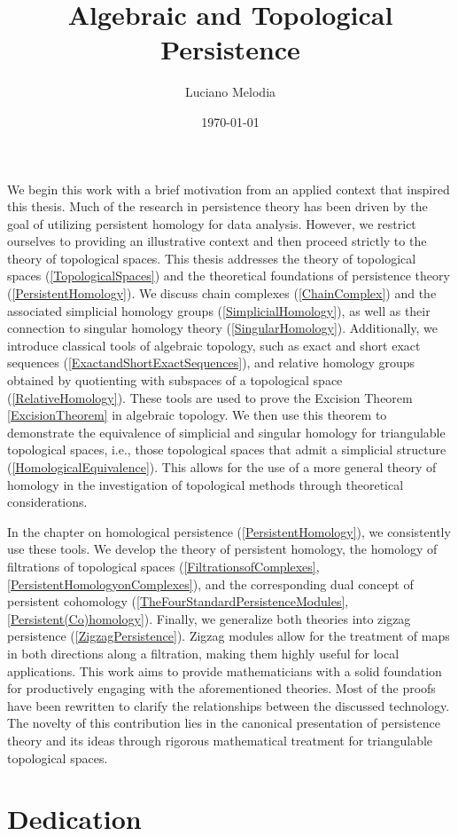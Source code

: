 \documentclass[b5paper, 12pt, twoside]{report}
\title{Algebraic and Topological Persistence}
\author{Luciano Melodia}
\date{\today}
\begin{document}
	
	
	We begin this work with a brief motivation from an applied context that inspired
	this thesis. Much of the research in persistence theory has been driven by the
	goal of utilizing persistent homology for data analysis. However, we restrict
	ourselves to providing an illustrative context and then proceed strictly to
	the theory of topological spaces. This thesis addresses the theory of topological
	spaces (\ref{TopologicalSpaces}) and the theoretical foundations of persistence
	theory (\ref{PersistentHomology}). We discuss chain complexes (\ref{ChainComplex})
	and the associated simplicial homology groups (\ref{SimplicialHomology}), as well
	as their connection to singular homology theory (\ref{SingularHomology}).
	Additionally, we introduce classical tools of algebraic topology, such as
	exact and short exact sequences (\ref{ExactandShortExactSequences}), and relative
	homology groups obtained by quotienting with subspaces of a topological space (\ref{RelativeHomology}).
	These tools are used to prove the Excision Theorem \ref{ExcisionTheorem} in
	algebraic topology. We then use this theorem to demonstrate the equivalence of
	simplicial and singular homology for triangulable topological spaces, i.e.,
	those topological spaces that admit a simplicial structure (\ref{HomologicalEquivalence}).
	This allows for the use of a more general theory of homology in the investigation
	of topological methods through theoretical considerations.

	In the chapter on homological persistence (\ref{PersistentHomology}), we consistently use these tools. We develop the theory of persistent homology, the homology of filtrations of
	topological spaces (\ref{FiltrationsofComplexes}, \ref{PersistentHomologyonComplexes}), and the corresponding dual concept of persistent cohomology (\ref{TheFourStandardPersistenceModules}, \ref{Persistent(Co)homology}). Finally, we generalize both theories into zigzag persistence (\ref{ZigzagPersistence}). Zigzag modules allow for the treatment of maps in both directions along a filtration, making them highly useful for local applications. This work aims to provide mathematicians with a solid foundation for productively engaging with
	the aforementioned theories. Most of the proofs have been rewritten to clarify
	the relationships between the discussed technology. The novelty of this
	contribution lies in the canonical presentation of persistence theory and
	its ideas through rigorous mathematical treatment for triangulable topological
	spaces.
	\chapter*{Dedication}
\end{document}
